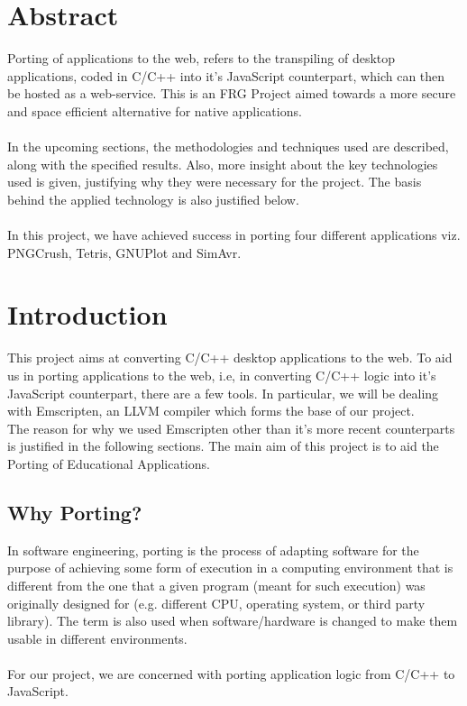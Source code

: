 \documentclass[12pt]{article}
\begin{document}
\section{Abstract}

Porting of applications to the web, refers to the transpiling of desktop applications, coded in C/C++ into it’s JavaScript counterpart, which can then be hosted as a web-service. This is an FRG Project aimed towards a more secure and space efficient alternative for native applications.
\\
\\
In the upcoming sections, the methodologies and techniques used are described, along with the specified results. Also, more insight about the key technologies used is given, justifying why they were necessary for the project. The basis behind the applied technology is also justified below.
\\
\\
In this project, we have achieved success in porting four different applications viz. PNGCrush, Tetris, GNUPlot and SimAvr.


\pagebreak

\section{Introduction} 
This project aims at converting C/C++ desktop applications to the web. To aid us in porting applications to the web, i.e, in converting C/C++ logic into it’s JavaScript counterpart, there are a few tools. In particular, we will be dealing with Emscripten, an LLVM compiler which forms the base of our project.
\\
The reason for why we used Emscripten other than it’s more recent counterparts is justified in the following sections. The main aim of this project is to aid the Porting of Educational Applications.  

\subsection{Why Porting?}
In software engineering, porting is the process of adapting software for the purpose of achieving some form of execution in a computing environment that is different from the one that a given program (meant for such execution) was originally designed for (e.g. different CPU, operating system, or third party library). The term is also used when software/hardware is changed to make them usable in different environments.  \cite{PortingDef}
\\
\\
For our project, we are concerned with porting application logic from C/C++ to JavaScript.
\end{document}
